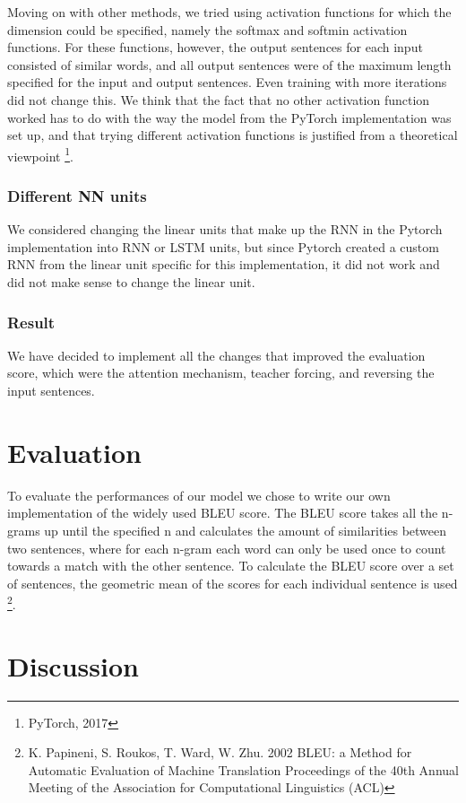 \documentclass[11pt]{article}
\begin{document}
Moving on with other methods, we tried using activation functions for which the dimension could be specified, namely the softmax and softmin activation functions. For these functions, however, the output sentences for each input consisted of similar words, and all output sentences were of the maximum length specified for the input and output sentences. Even training with more iterations did not change this. We think that the fact that no other activation function worked has to do with the way the model from the PyTorch implementation was set up, and that trying different activation functions is justified from a theoretical viewpoint \footnote[11]{PyTorch, 2017}.

\subsubsection*{Different NN units}
We considered changing the linear units that make up the RNN in the Pytorch implementation into RNN or LSTM units, but since Pytorch created a custom RNN from the linear unit specific for this implementation, it did not work and did not make sense to change the linear unit.

\subsubsection*{Result}
We have decided to implement all the changes that improved the evaluation score, which were the attention mechanism, teacher forcing, and reversing the input sentences.

\section{Evaluation}
To evaluate the performances of our model we chose to write our own implementation of the widely used BLEU score. The BLEU score takes all the n-grams up until the specified n and calculates the amount of similarities between two sentences, where for each n-gram each word can only be used once to count towards a match with the other sentence. To calculate the BLEU score over a set of sentences, the geometric mean of the scores for each individual sentence is used \footnote[12]{K. Papineni, S. Roukos, T. Ward, W. Zhu. 2002 BLEU: a Method for Automatic Evaluation of Machine Translation Proceedings of the 40th Annual Meeting of the Association for Computational Linguistics (ACL)}.

\section{Discussion}
\end{document}

